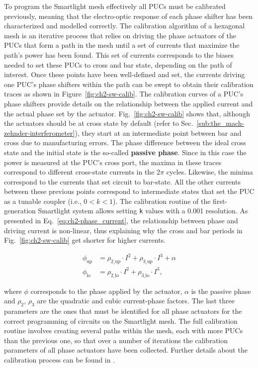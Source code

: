 To program the Smartlight mesh effectively all PUCs must be calibrated previously, meaning that the electro-optic response of each phase shifter has been characterized and modelled correctly.
The calibration algorithm of a hexagonal mesh is an iterative process that relies on driving the phase actuators of the PUCs that form a path in the mesh until a set of currents that maximize the path's power has been found.
This set of currents corresponds to the biases needed to set these PUCs to cross and bar state, depending on the path of interest.
Once these points have been well-defined and set, the currents driving one PUC's phase shifters within the path can be swept to obtain their calibration traces as shown in Figure~\ref{fig:ch2-sw-calib}.
The calibration curves of a PUC's phase shifters provide details on the relationship between the applied current and the actual phase set by the actuator.
Fig.~\ref{fig:ch2-sw-calib} shows that, although the actuators should be at cross state by default (refer to Sec.~\ref{sub:the_mach-zehnder-interferometer}), they start at an intermediate point between bar and cross due to manufacturing errors.
The phase difference between the ideal cross state and the initial state is the so-called \textbf{passive phase}.
Since in this case the power is measured at the PUC's cross port, the maxima in these traces correspond to different cross-state currents in the 2\(\pi\) cycles.
Likewise, the minima correspond to the currents that set circuit to bar-state.
All the other currents between these previous points correspond to intermediate states that set the PUC as a tunable coupler (i.e., \(0 < k < 1\)).
The calibration routine of the first-generation Smartlight system allows setting \lstinline|k| values with a 0.001 resolution.
As presented in Eq.~\eqref{eq:ch2-phase_current}, the relationship between phase and driving current is non-linear, thus explaining why the cross and bar periods in Fig.~\ref{fig:ch2-sw-calib} get shorter for higher currents.

\begin{equation}
	\begin{aligned}
		\phi_{\text{up}} & = \rho_{2\_\text{up}} \cdot I^2 + \rho_{3\_\text{up}} \cdot I^3 + \alpha \\
		\phi_{\text{lo}} & = \rho_{2\_\text{lo}} \cdot I^2 + \rho_{3\_\text{lo}} \cdot I^3,
	\end{aligned}
	\label{eq:ch2-phase_current}
\end{equation}

where \(\phi\) corresponds to the phase applied by the actuator, \(\alpha\) is the passive phase and \(\rho_2\), \(\rho_3\) are the quadratic and cubic current-phase factors.
The last three parameters are the ones that must be identified for all phase actuators for the correct programming of circuits on the Smartlight mesh.
The full calibration routine involves creating several paths within the mesh, each with more PUCs than the previous one, so that over a number of iterations the calibration parameters of all phase actuators have been collected.
Further details about the calibration process can be found in \cite{lopez-hernandez_automatic_2022,jia_calibration_2024}.

